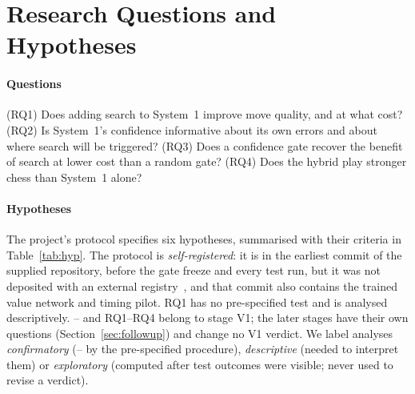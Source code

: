 \section{Research Questions and Hypotheses}
\label{sec:hyp}
\paragraph*{Questions} (RQ1) Does adding search to System~1 improve move quality, and at what cost? (RQ2) Is System~1's confidence informative about its own errors and about where search will be triggered? (RQ3) Does a confidence gate recover the benefit of search at lower cost than a random gate? (RQ4) Does the hybrid play stronger chess than System~1 alone?

\paragraph*{Hypotheses} The project's protocol specifies six hypotheses, summarised with their criteria in Table~\ref{tab:hyp}. The protocol is \emph{self-registered}: it is in the earliest commit of the supplied repository, before the gate freeze and every test run, but it was not deposited with an external registry~\cite{nosek2018}, and that commit also contains the trained value network and timing pilot. RQ1 has no pre-specified test and is analysed descriptively. \Hone--\Hsix{} and RQ1--RQ4 belong to stage V1; the later stages have their own questions (Section~\ref{sec:followup}) and change no V1 verdict. We label analyses \emph{confirmatory} (\Hone--\Hsix{} by the pre-specified procedure), \emph{descriptive} (needed to interpret them) or \emph{exploratory} (computed after test outcomes were visible; never used to revise a verdict).

